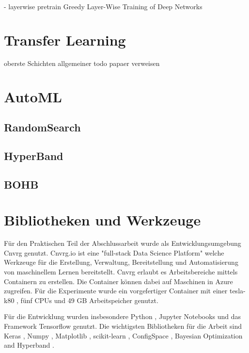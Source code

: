 		- layerwise pretrain {Greedy Layer-Wise Training of Deep Networks}
	\section{Transfer Learning}
	\label{sec:TransferLearning}
			oberste Schichten allgemeiner todo papaer verweisen
	\section{AutoML}
	\label{sec:AutoML}
		
		\subsection{RandomSearch }
		
		\subsection{HyperBand }

		\subsection{BOHB }


	\section{Bibliotheken und Werkzeuge}
	\label{sec:BibliothekenundWerkzeuge}
	Für den Praktischen Teil der Abschlussarbeit wurde als Entwicklungsumgebung Cnvrg \cite{cnvrg.io.} genutzt. Cnvrg.io ist eine "full-stack Data Science Platform" welche Werkzeuge für die Erstellung, Verwaltung, Bereitstellung und Automatisierung von maschinellem Lernen bereitstellt. Cnvrg erlaubt es Arbeitsbereiche mittels Containern zu erstellen. Die Container können dabei auf Maschinen in Azure \cite{Micorsoft.2020} zugreifen. Für die Experimente wurde ein vorgefertiger Container mit einer tesla-k80 \cite{Nvidia.2020}, fünf CPUs und 49 GB Arbeitspeicher genutzt. 

	Für die Entwicklung wurden insbesondere Python \cite{PythonSoftwareFoundation.2020}, Jupyter Notebooks \cite{ProjectJupyter} und das Framework Tensorflow \cite{MartinAbadi.2015}  genutzt. Die wichtigsten Bibliotheken für die Arbeit sind Keras \cite{Chollet.2015} , Numpy \cite{Oliphant.2006} , Matplotlib \cite{Hunter.2007} , scikit-learn \cite{Pedregosa.2011} , ConfigSpace \cite{Lindauer.8162019} , Bayesian Optimization and Hyperband \cite{StefanFalkner.2018} . 
	
